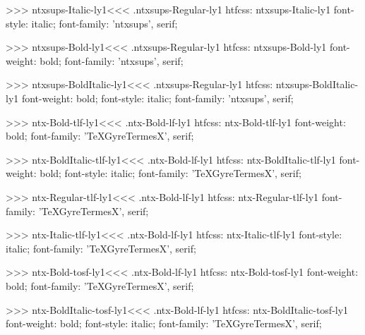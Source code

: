 >>>
\<ntxsups-Italic-ly1\><<<
.ntxsups-Regular-ly1
htfcss:  ntxsups-Italic-ly1  font-style: italic; font-family: 'ntxsups', serif;

>>>
\<ntxsups-Bold-ly1\><<<
.ntxsups-Regular-ly1
htfcss:  ntxsups-Bold-ly1  font-weight: bold; font-family: 'ntxsups', serif;

>>>
\<ntxsups-BoldItalic-ly1\><<<
.ntxsups-Regular-ly1
htfcss:  ntxsups-BoldItalic-ly1  font-weight: bold; font-style: italic; font-family: 'ntxsups', serif;

>>>
\<ntx-Bold-tlf-ly1\><<<
.ntx-Bold-lf-ly1
htfcss:  ntx-Bold-tlf-ly1  font-weight: bold; font-family: 'TeXGyreTermesX', serif;

>>>
\<ntx-BoldItalic-tlf-ly1\><<<
.ntx-Bold-lf-ly1
htfcss:  ntx-BoldItalic-tlf-ly1  font-weight: bold; font-style: italic; font-family: 'TeXGyreTermesX', serif;

>>>
\<ntx-Regular-tlf-ly1\><<<
.ntx-Bold-lf-ly1
htfcss:  ntx-Regular-tlf-ly1  font-family: 'TeXGyreTermesX', serif;

>>>
\<ntx-Italic-tlf-ly1\><<<
.ntx-Bold-lf-ly1
htfcss:  ntx-Italic-tlf-ly1  font-style: italic; font-family: 'TeXGyreTermesX', serif;

>>>
\<ntx-Bold-tosf-ly1\><<<
.ntx-Bold-lf-ly1
htfcss:  ntx-Bold-tosf-ly1  font-weight: bold; font-family: 'TeXGyreTermesX', serif;

>>>
\<ntx-BoldItalic-tosf-ly1\><<<
.ntx-Bold-lf-ly1
htfcss:  ntx-BoldItalic-tosf-ly1  font-weight: bold; font-style: italic; font-family: 'TeXGyreTermesX', serif;

